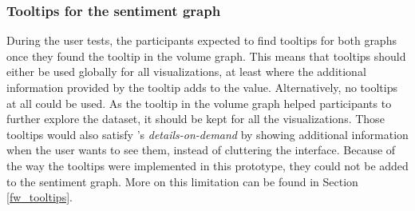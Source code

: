 \subsubsection*{Tooltips for the sentiment graph}
During the user tests, the participants expected to find tooltips for both graphs once they found the tooltip in the volume graph. This means that tooltips should either be used globally for all visualizations, at least where the additional information provided by the tooltip adds to the value. Alternatively, no tooltips at all could be used. As the tooltip in the volume graph helped participants to further explore the dataset, it should be kept for all the visualizations. Those tooltips would also satisfy \citeauthor{shneidermanEyesHaveIt1996}'s \emph{details-on-demand} by showing additional information when the user wants to see them, instead of cluttering the interface. Because of the way the tooltips were implemented in this prototype, they could not be added to the sentiment graph. More on this limitation can be found in Section \ref{fw_tooltips}.
